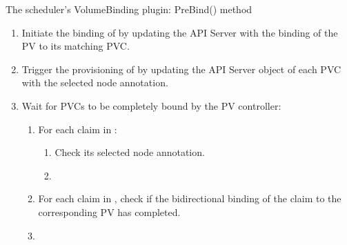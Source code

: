 \begin{algorithm}[h]
      \caption{The scheduler's VolumeBinding plugin: PreBind() method}
      \label{alg:vol-binding-prebind}
       
      \begin{enumerate}[leftmargin=0.5cm]
            \tightlist
            \item Initiate the binding of  by updating the API
                  Server with the binding of the PV to its matching PVC.
            \item Trigger the provisioning of  by updating
                  the API Server object of each PVC with the selected node
                  annotation.
            \item Wait for PVCs to be completely bound by the PV controller:
                  \begin{enumerate}[]
                        \tightlist
                        \item For each claim in :
                              \begin{enumerate}
                                    \item Check its selected node annotation.
                                    \item {}
                              \end{enumerate}

                        \item For each claim in , check if
                              the bidirectional binding of the claim to the
                              corresponding PV has completed.
                        \item {}
                  \end{enumerate}
      \end{enumerate}
\end{algorithm}